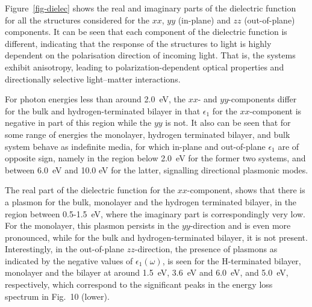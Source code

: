 \documentclass[aps,prb,preprint,notitlepage]{revtex4-2}
\begin{document}
Figure~\ref{fig-dielec} shows 
the real and imaginary parts of the dielectric function for all the structures 
considered for the $xx$, $yy$ (in-plane) and $zz$ (out-of-plane) components.
It can be seen that
each component of the dielectric function is different, indicating 
that the response of the structures to light is highly dependent on the
polarisation direction of incoming light.
That is, the systems exhibit anisotropy, leading to polarization-dependent 
optical properties and directionally selective light–matter interactions.

For photon energies less than around 2.0~eV, the $xx$- and $yy$-components differ for the bulk and hydrogen-terminated bilayer
in that $\epsilon_1$ for the $xx$-component
is negative in part of this region while the $yy$ is not.
It also can be seen that for some range of energies the monolayer, hydrogen
terminated bilayer, and bulk 
system behave as indefinite media, for which in-plane and out-of-plane $\epsilon_1$
are of opposite sign, namely in the region below 2.0~eV for the former
two systems, and 
between 6.0~eV and 10.0 eV for the latter, signalling directional plasmonic modes. 

The real part of the dielectric function for the $xx$-component,
shows that there is a plasmon for the bulk, monolayer and the
hydrogen terminated bilayer, in the region between 0.5-1.5~eV, where the imaginary part is correspondingly
very low. For the monolayer, this plasmon persists in the $yy$-direction and
is even more pronounced, while for the bulk and hydrogen-terminated bilayer,
it is not present.
Interestingly, in the out-of-plane $zz$-direction, the presence of plasmons
as
indicated by the negative values of $\epsilon_1(\omega)$, is seen 
for the H-terminated bilayer, monolayer and the  bilayer 
at around 1.5~eV, 3.6~eV and 6.0~eV, and 5.0~eV, respectively, which 
correspond to the significant peaks in the energy loss spectrum in Fig.~10 (lower).
\end{document}
